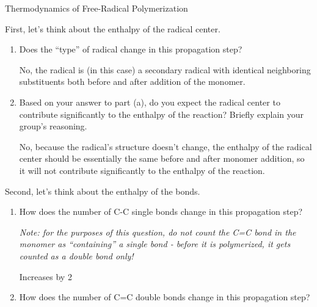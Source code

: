 \begin{activity}{Thermodynamics of Free-Radical Polymerization}
\begin{model}
\end{model}


\begin{ctqs}

	\question First, let's think about the enthalpy of the radical center. \label{\labelbase:ctq:radicalenthalpy}
	
		\begin{enumerate}
		
			\item Does the ``type'' of radical change in this propagation step?
				
				\begin{solution}[0.5in]
					No, the radical is (in this case) a secondary radical with identical neighboring substituents both before and after addition of the monomer.
				\end{solution}
			
			\item Based on your answer to part (a), do you expect the radical center to contribute significantly to the enthalpy of the reaction?  Briefly explain your group's reasoning.
				
				\begin{solution}[1in]
					No, because the radical's structure doesn't change, the enthalpy of the radical center should be essentially the same before and after monomer addition, so it will not contribute significantly to the enthalpy of the reaction.
				\end{solution}
			
		\end{enumerate}
		
	\question Second, let's think about the enthalpy of the bonds. \label{\labelbase:ctq:bondenthalpy}
	
		\begin{enumerate}
			\item How does the number of C-C single bonds change in this propagation step?
			
				\emph{Note: for the purposes of this question, do not count the C=C bond in the monomer as ``containing'' a single bond - before it is polymerized, it gets counted as a double bond only!}
				
				\begin{solution}[0.75in]
					Increases by 2
				\end{solution}
			
			\item How does the number of C=C double bonds change in this propagation step?
				

\end{enumerate}
\end{ctqs}
\end{activity}
